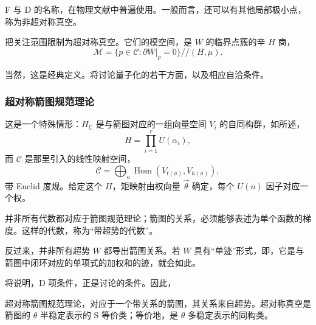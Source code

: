 F 与 D 的名称，在物理文献中普遍使用。一般而言，还可以有其他局部极小点，称为非超对称真空。

把关注范围限制为超对称真空。它们的模空间，是 $W$ 的临界点簇的辛 $H$ 商，
\begin{equation}\label{eq:5.80}
\mathcal{M}=\{p\in\mathcal{C}:\partial W|_p=0\}\mathbin{//}(H,\mu).
\end{equation}

当然，这是经典定义。将讨论量子化的若干方面，以及相应自洽条件。

\subsubsection{超对称箭图规范理论}\label{sec:5.4.1.3}

这是一个特殊情形：$H_{\mathbb C}$ 是与箭图对应的一组向量空间 $V_i$ 的自同构群，如所述，
\begin{equation}\label{eq:5.81}
H=\prod_{i=1}^r U(\alpha_i),
\end{equation}
而 $\mathcal{C}$ 是那里引入的线性映射空间，
\[
\mathcal{C}=\bigoplus_a\operatorname{Hom}(V_{t(a)},V_{h(a)}),
\]
带 Euclid 度规。给定这个 $H$，矩映射由权向量 $\vec\theta$ 确定，每个 $U(n)$ 因子对应一个权。

并非所有代数都对应于箭图规范理论；箭图的关系，必须能够表述为单个函数的梯度。这样的代数，称为“带超势的代数”。

反过来，并非所有超势 $W$ 都导出箭图关系。若 $W$ 具有“单迹”形式，即，它是与箭图中闭环对应的单项式的加权和的迹，就会如此。

将说明，D 项条件，正是讨论的条件。因此，
\begin{proposition}\label{prop:5.20}
超对称箭图规范理论，对应于一个带关系的箭图，其关系来自超势。超对称真空是箭图的 $\theta$ 半稳定表示的 S 等价类；等价地，是 $\theta$ 多稳定表示的同构类。
\end{proposition}


